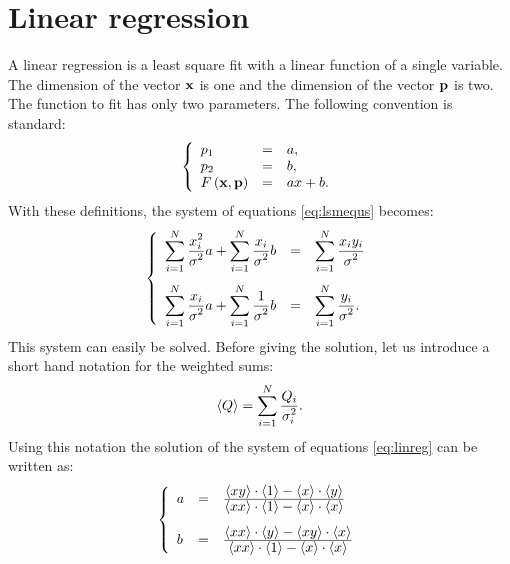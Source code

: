 \documentclass[twoside]{book}
\begin{document}
\section{Linear regression}
A linear regression is a least square fit with a linear function
of a single variable. The dimension of the vector ${\bf x}$ is one
and the dimension of the vector ${\bf p}$ is two. The function to
fit has only two parameters. The following convention is standard:
\begin{equation}
  \left\{
  \begin{array}{lcl}
    p_1 & = & a, \\
    p_2 & = & b, \\
    F\left({\bf x},{\bf p}\right)&=&ax+b.
  \end{array}
  \right.
\end{equation}
With these definitions, the system of equations \ref{eq:lsmequs}
becomes:
\begin{equation}
\label{eq:linreg}
  \left\{
  \begin{array}{lcl}
    \displaystyle \sum_{i=1}^N {\displaystyle x_i^2\over\displaystyle\sigma^2}a
    + \sum_{i=1}^N {\displaystyle x_i\over\displaystyle\sigma^2}b& = &
    \displaystyle\sum_{i=1}^N {\displaystyle x_i y_i\over\displaystyle\sigma^2}
    \\*[4ex]
    \displaystyle\sum_{i=1}^N {\displaystyle x_i\over\displaystyle\sigma^2}a
    + \sum_{i=1}^N {\displaystyle 1\over\displaystyle\sigma^2}b& = &
    \displaystyle\sum_{i=1}^N {\displaystyle y_i\over\displaystyle\sigma^2}.
  \end{array}
  \right.
\end{equation}
This system can easily be solved. Before giving the solution, let
us introduce a short hand notation for the weighted sums:
\begin{equation}
\left\langle Q\right\rangle = \sum_{i=1}^N {\displaystyle
Q_i\over\displaystyle\sigma^2_i}.
\end{equation}
Using this notation the solution of the system of equations
\ref{eq:linreg} can be written as:
\begin{equation}
  \left\{
  \begin{array}{lcl}
    a& = & {\displaystyle\left\langle xy\right\rangle\cdot\left\langle 1\right\rangle-\left\langle x\right\rangle\cdot\left\langle y\right\rangle
       \over\displaystyle\left\langle xx\right\rangle\cdot\left\langle 1\right\rangle-\left\langle x\right\rangle\cdot\left\langle x\right\rangle}
    \\*[3ex]
    b& = & {\displaystyle\left\langle xx\right\rangle\cdot\left\langle y\right\rangle-\left\langle xy\right\rangle\cdot\left\langle x\right\rangle
       \over\displaystyle\left\langle xx\right\rangle\cdot\left\langle 1\right\rangle-\left\langle x\right\rangle\cdot\left\langle x\right\rangle}
  \end{array}
  \right.
\end{equation}
\end{document}
